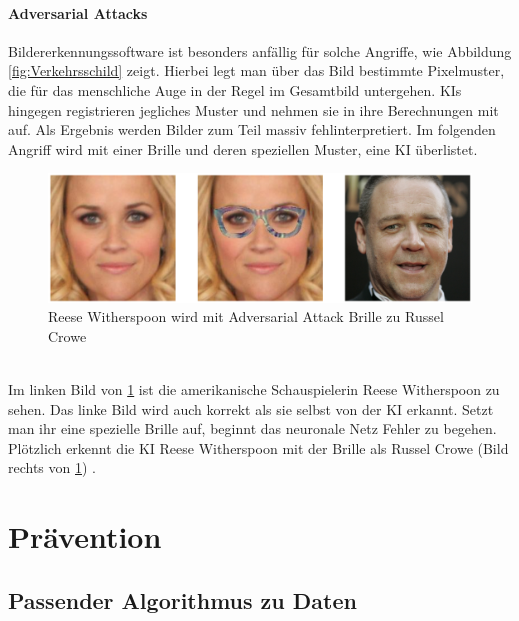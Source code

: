\documentclass[12pt,oneside,a4paper,parskip]{scrbook}
\begin{document}
\subsubsection{Adversarial Attacks}
Bildererkennungssoftware ist besonders anfällig für solche Angriffe, wie Abbildung \ref{fig:Verkehrsschild} zeigt.
Hierbei legt man über das Bild bestimmte Pixelmuster, die für das menschliche Auge in der Regel im Gesamtbild untergehen. KIs hingegen registrieren jegliches Muster und nehmen sie in ihre Berechnungen mit auf. Als Ergebnis werden Bilder zum Teil massiv fehlinterpretiert.
Im folgenden Angriff wird mit einer Brille und deren speziellen Muster, eine KI überlistet.
\label{section:BrilleAttack}
\begin{figure}[h]
	\begin{center}
		\includegraphics[width=15cm]{Bilder/Brille_Adversarial_Attack.png}
		\caption{Reese Witherspoon wird mit Adversarial Attack Brille zu Russel Crowe\cite{Attack}}
		\label{fig:BrilleAttack}
	\end{center}
\end{figure}
\\Im linken Bild von \ref{fig:BrilleAttack} ist die amerikanische Schauspielerin Reese Witherspoon zu sehen. Das linke Bild wird auch korrekt als sie selbst von der KI erkannt. Setzt man ihr eine spezielle Brille auf, beginnt das neuronale Netz Fehler zu begehen. Plötzlich erkennt die KI Reese Witherspoon mit der Brille als Russel Crowe (Bild rechts von \ref{fig:BrilleAttack}) \cite{Attack}.

\chapter{Prävention}
\label{chapter:main}
\section{Passender Algorithmus zu Daten}
\end{document}
